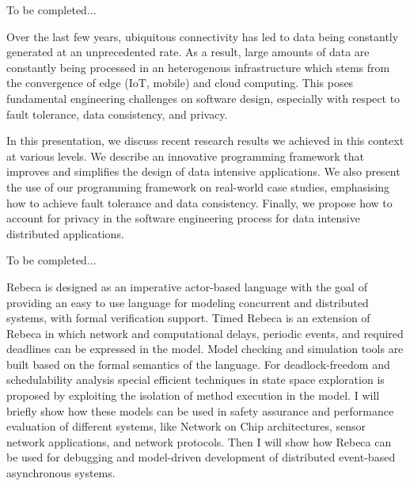 \documentclass[a4paper,UKenglish]{dagrep-v2018}
\begin{document}
\license

To be completed...


\license

Over the last few years, ubiquitous connectivity has led to data being constantly generated at an unprecedented rate. As a result, large amounts of data are constantly being processed in 
an heterogenous infrastructure which stems from the convergence of edge (IoT, mobile) and cloud computing. This poses fundamental engineering challenges on software design, especially with respect to fault tolerance, data consistency, and privacy.

In this presentation, we discuss recent research results we achieved in this context at various levels. We describe an innovative programming framework that improves and simplifies the design of data intensive applications. We also present the use of our programming framework on real-world case studies, emphasising how to achieve fault tolerance and data consistency. Finally, we propose how to account for privacy in the software engineering process for data intensive distributed applications.


\license

To be completed...


\license

Rebeca is designed as an imperative actor-based language with the goal of providing an easy to use language for modeling concurrent and distributed systems, with formal verification support.
Timed Rebeca is an extension of Rebeca in which network and computational delays, periodic events, and required deadlines can be expressed in the model. Model checking and simulation tools are built based on the formal semantics of the language. For deadlock-freedom and schedulability analysis special efficient techniques in state space exploration is proposed by exploiting the isolation of method execution in the model. I will briefly show how these models can be used in safety assurance and performance evaluation of different systems, like Network on Chip architectures, sensor network applications, and network protocols. Then I will show how Rebeca can be used for debugging and model-driven development of distributed event-based asynchronous systems.
\end{document}
